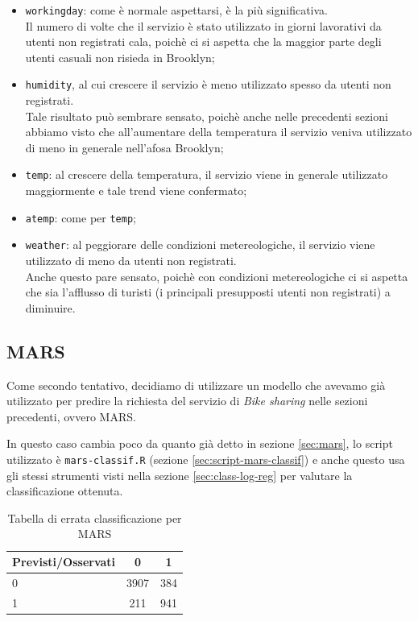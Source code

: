 \begin{itemize}
\item \texttt{workingday}: come è normale aspettarsi, è la più significativa.\\
  Il numero di volte che il servizio è stato utilizzato in giorni lavorativi
  da utenti non registrati cala, poichè ci si aspetta che la maggior parte
  degli utenti casuali non risieda in Brooklyn;
\item \texttt{humidity}, al cui crescere il servizio è meno utilizzato spesso
  da utenti non registrati. \\
  Tale risultato può sembrare sensato, poichè anche nelle precedenti sezioni
  abbiamo visto che all'aumentare della temperatura il servizio veniva
  utilizzato di meno in generale nell'afosa Brooklyn;
\item \texttt{temp}: al crescere della temperatura, il servizio viene in
  generale utilizzato maggiormente e tale trend viene confermato;
\item \texttt{atemp}: come per \texttt{temp};
\item \texttt{weather}: al peggiorare delle condizioni metereologiche, il
  servizio viene utilizzato di meno da utenti non registrati. \\
  Anche questo pare sensato, poichè con condizioni metereologiche ci si
  aspetta che sia l'afflusso di turisti (i principali presupposti utenti non
  registrati) a diminuire.
\end{itemize}


\subsection{MARS}\label{sec:class-mars}

Come secondo tentativo, decidiamo di utilizzare un modello che avevamo già
utilizzato per predire la richiesta del servizio di \emph{Bike sharing} nelle
sezioni precedenti, ovvero MARS.

In questo caso cambia poco da quanto già detto in sezione \ref{sec:mars}, lo
script utilizzato è \texttt{mars-classif.R} (sezione
\ref{sec:script-mars-classif}) e anche questo usa gli stessi strumenti visti
nella sezione \ref{sec:class-log-reg} per valutare la classificazione ottenuta.

\begin{table}[H]
\begin{center}
\begin{tabular}{ | l || c | c | }
  \hline
    Previsti/Osservati & 0 & 1 \\ \hline \hline
    0 & 3907 & 384 \\ \hline
    1 & 211 & 941 \\ \hline
\end{tabular}
  \caption{Tabella di errata classificazione per MARS}
\end{center}
\end{table}

